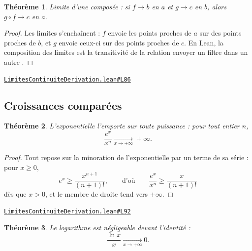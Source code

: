 \documentclass[11pt,a4paper]{article}
\theoremstyle{definition}
\theoremstyle{plain}
\newtheorem{theoreme}{Théorème}
\newcommand{\source}[2]{\par\smallskip\noindent\hfill{\footnotesize\href{#1}{\texttt{#2}}}\par\smallskip}
\begin{document}
\begin{theoreme}
Limite d'une composée : si $f \to b$ en $a$ et $g \to c$ en $b$, alors $g \circ f \to c$
en $a$.
\end{theoreme}

\begin{proof}
Les limites s'enchaînent : $f$ envoie les points proches de $a$ sur des points proches de
$b$, et $g$ envoie ceux-ci sur des points proches de $c$. En Lean, la composition des
limites est la transitivité de la relation \og{} envoyer un filtre dans un autre \fg{}.
\end{proof}
\source{https://github.com/Commutator-IO/learn-lean/blob/main/courses/02-lycee/04-limites-continuite-derivation/LimitesContinuiteDerivation.lean\#L86}{LimitesContinuiteDerivation.lean\#L86}

\subsection{Croissances comparées}

\begin{theoreme}
L'exponentielle l'emporte sur toute puissance : pour tout entier $n$,
\[ \frac{e^x}{x^n} \xrightarrow[x \to +\infty]{} +\infty . \]
\end{theoreme}

\begin{proof}
Tout repose sur la minoration de l'exponentielle par un terme de sa série : pour $x \ge 0$,
\[ e^x \ge \frac{x^{n+1}}{(n+1)!} ,
   \qquad\text{d'où}\qquad \frac{e^x}{x^n} \ge \frac{x}{(n+1)!} \]
dès que $x > 0$, et le membre de droite tend vers $+\infty$.
\end{proof}
\source{https://github.com/Commutator-IO/learn-lean/blob/main/courses/02-lycee/04-limites-continuite-derivation/LimitesContinuiteDerivation.lean\#L92}{LimitesContinuiteDerivation.lean\#L92}

\begin{theoreme}
Le logarithme est négligeable devant l'identité :
\[ \frac{\ln x}{x} \xrightarrow[x \to +\infty]{} 0 . \]
\end{theoreme}
\end{document}
